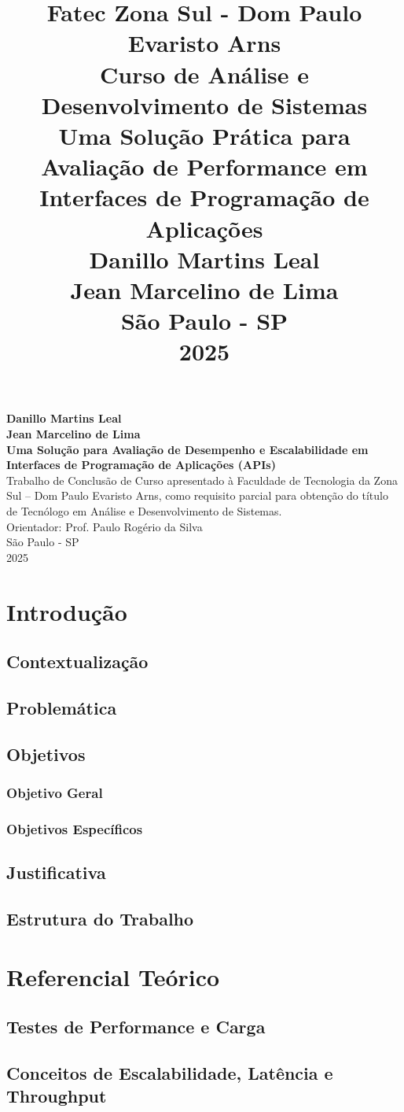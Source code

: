 \documentclass[a4paper,12pt]{article}
\title{
    \vspace{4cm}
    \textbf{Fatec Zona Sul - Dom Paulo Evaristo Arns}\\
    \vspace{1cm}
    \textbf{Curso de Análise e Desenvolvimento de Sistemas}\\
    \vspace{3cm}
    \textbf{\large Uma Solução Prática para Avaliação de Performance em Interfaces de Programação de Aplicações
}\\
    \vspace{3cm}
    \textbf{Danillo Martins Leal}\\
    \textbf{Jean Marcelino de Lima}\\
    \vspace{3cm}
    São Paulo - SP\\
    2025
}
\author{}
\date{}
\newcommand{\folhaderosto}{
    \begin{titlepage}
        \centering
        \vspace*{2cm}

        \textbf{Danillo Martins Leal}\\
        \textbf{Jean Marcelino de Lima}\\[3cm]

        {\large \textbf{Uma Solução para Avaliação de Desempenho e Escalabilidade em Interfaces de Programação de Aplicações (APIs)}}\\[2cm]

        Trabalho de Conclusão de Curso apresentado à Faculdade de Tecnologia da Zona Sul – Dom Paulo Evaristo Arns, como requisito parcial para obtenção do título de Tecnólogo em Análise e Desenvolvimento de Sistemas.\\[1.5cm]

        Orientador: Prof. Paulo Rogério da Silva\\[3cm]

        São Paulo - SP\\
        2025

        \vfill
    \end{titlepage}
}
\begin{document}
\maketitle
\folhaderosto

\newpage
\tableofcontents
\newpage

\clearpage
{}
\setcounter{page}{4}
\pagestyle{plain}


\section{Introdução}
\subsection{Contextualização}
\subsection{Problemática}
\subsection{Objetivos}
\subsubsection{Objetivo Geral}
\subsubsection{Objetivos Específicos}
\subsection{Justificativa}
\subsection{Estrutura do Trabalho}

\section{Referencial Teórico}
\subsection{Testes de Performance e Carga}
\subsection{Conceitos de Escalabilidade, Latência e Throughput}
\end{document}
